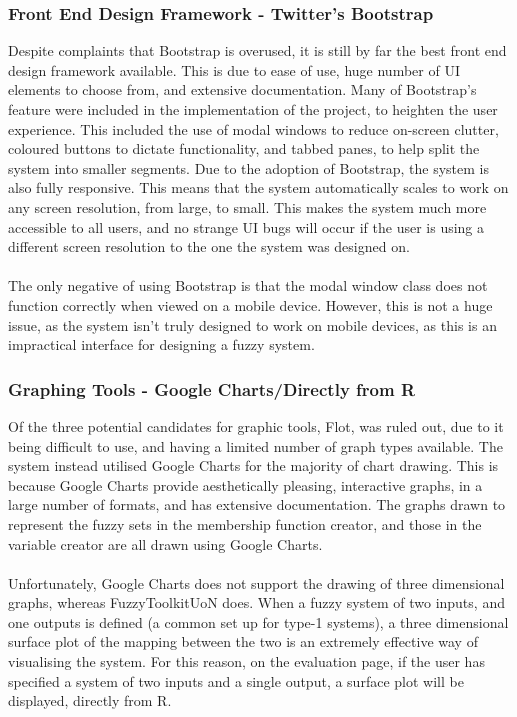 \tocless\subsubsection{Front End Design Framework - Twitter's Bootstrap}
Despite complaints that Bootstrap is overused, it is still by far the best front end design framework available. This is due to ease of use, huge number of UI elements to choose from, and extensive documentation. Many of Bootstrap's feature were included in the implementation of the project, to heighten the user experience. This included the use of modal windows to reduce on-screen clutter, coloured buttons to dictate functionality, and tabbed panes, to help split the system into smaller segments. Due to the adoption of Bootstrap, the system is also fully responsive. This means that the system automatically scales to work on any screen resolution, from large, to small. This makes the system much more accessible to all users, and no strange UI bugs will occur if the user is using a different screen resolution to the one the system was designed on. \ \\
\ \\
The only negative of using Bootstrap is that the modal window class does not function correctly when viewed on a mobile device. However, this is not a huge issue, as the system isn't truly designed to work on mobile devices, as this is an impractical interface for designing a fuzzy system. 

\tocless\subsubsection{Graphing Tools - Google Charts/Directly from R}
Of the three potential candidates for graphic tools, Flot, was ruled out, due to it being difficult to use, and having a limited number of graph types available. The system instead utilised Google Charts for the majority of chart drawing. This is because Google Charts provide aesthetically pleasing, interactive graphs, in a large number of formats, and has extensive documentation. The graphs drawn to represent the fuzzy sets in the membership function creator, and those in the variable creator are all drawn using Google Charts.\ \\
\ \\
Unfortunately, Google Charts does not support the drawing of three dimensional graphs, whereas FuzzyToolkitUoN does. When a fuzzy system of two inputs, and one outputs is defined (a common set up for type-1 systems), a three dimensional surface plot of the mapping between the two is an extremely effective way of visualising the system. For this reason, on the evaluation page, if the user has specified a system of two inputs and a single output, a surface plot will be displayed, directly from R.

